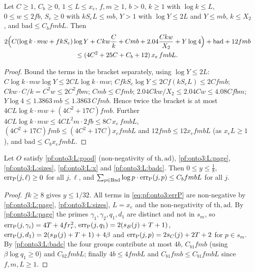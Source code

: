 \begin{lemma}[Absorption]\label{pf:onto3:absorb}
Let $C\ge1$, $C_b\ge0$, $1\le L\le x_e$, $f,m\ge1$, $b>0$, $k\ge1$ with $\log k\le L$, $0\le w\le2fb$, $S_e\ge0$
with $kS_eL\le mb$, $Y>1$ with $\log Y\le2L$ and $Y\le mb$, $k\le X_2$, and $\mathrm{bad}\le C_bfmbL$. Then
\begin{multline*}
2\Bigl(C(\log k\cdot mw+fkS_e)\log Y+Ckw\frac Ck+Cmb+2.04\frac{Ckw}{X_2}+Y\log4\Bigr)+\mathrm{bad}+12fmb\\
\le(4C^2+25C+C_b+12)\,x_e\,fmbL .
\end{multline*}
\end{lemma}

\begin{proof}
Bound the terms in the bracket separately, using $\log Y\le2L$: $C\log k\cdot mw\log Y\le2CL\log k\cdot mw$;
$CfkS_e\log Y\le2Cf(kS_eL)\le2Cfmb$; $Ckw\cdot C/k=C^2w\le2C^2fbm$; $Cmb\le Cfmb$;
$2.04Ckw/X_2\le2.04Cw\le4.08Cfbm$; $Y\log4\le1.3863\,mb\le1.3863\,Cfmb$. Hence twice the bracket is at most
$4CL\log k\cdot mw+(4C^2+17C)fmb$. Further $4CL\log k\cdot mw\le4CL^2m\cdot2fb\le8C\,x_e\,fmbL$,
$(4C^2+17C)fmb\le(4C^2+17C)x_efmbL$ and $12fmb\le12x_efmbL$ (as $x_eL\ge1$), and $\mathrm{bad}\le C_bx_efmbL$.
\end{proof}

\begin{lemma}\label{pf:onto3:badsum}
Let $O$ satisfy \ref{pf:onto3:L:good} (non-negativity of $\mathrm{th},\mathrm{ad}$), \ref{pf:onto3:L:page},
\ref{pf:onto3:L:sizes}, \ref{pf:onto3:L:x} and \ref{pf:onto3:L:badc}. Then $0\le y\le\frac18$,
$\mathrm{err}_{\mathrm{P}}(j,\ell)\ge0$ for all $j,\ell$, and $\sum_{p\in\mathrm{Bad}}\log p\cdot\mathrm{err}_{\mathrm{P}}(j,p)\le
C_bfmbL$ for all $j$.
\end{lemma}

\begin{proof}
$fk\ge8$ gives $y\le1/32$. All terms in \eqref{eq:pf:onto3:errP} are non-negative by \ref{pf:onto3:L:page},
\ref{pf:onto3:L:sizes}, $L=x_e$ and the non-negativity of $\mathrm{th},\mathrm{ad}$. By \ref{pf:onto3:L:page} the
primes $\gamma_1,\gamma_2,q_1,d_1$ are distinct and not in $s_m$, so $\mathrm{err}_{\mathrm{P}}(j,\gamma_i)=4T+4fr_r^2$,
$\mathrm{err}_{\mathrm{P}}(j,q_1)=2(s_B(j)+T+1)$, $\mathrm{err}_{\mathrm{P}}(j,d_1)=2(s_B(j)+T+1)+4\beta$ and
$\mathrm{err}_{\mathrm{P}}(j,p)=2s_C(j)+2T+2$ for $p\in s_m$. By \ref{pf:onto3:L:badc} the four groups contribute at most
$4b$, $C_{b1}fmb$ (using $\beta\log q_1\ge0$) and $C_{b2}fmbL$; finally $4b\le4fmbL$ and $C_{b1}fmb\le
C_{b1}fmbL$ since $f,m,L\ge1$.
\end{proof}

